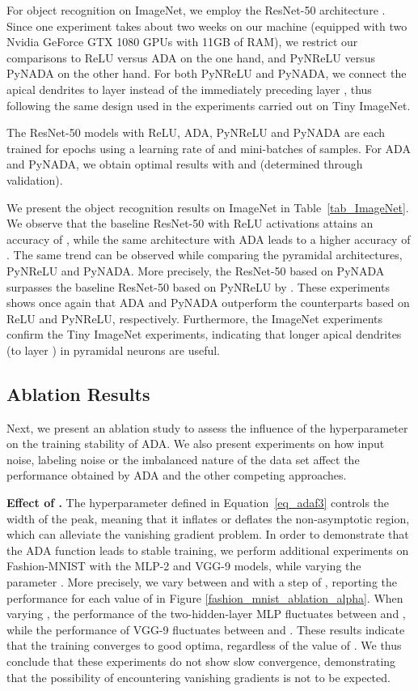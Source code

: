 \documentclass[pdflatex,sn-mathphys]{sn-jnl}
\theoremstyle{thmstyleone}
\theoremstyle{thmstyletwo}\newtheorem{example}{Example}\newtheorem{remark}{Remark}
\theoremstyle{thmstylethree}\newtheorem{definition}{Definition}\DeclareMathOperator{\sinc}{sinc}
\begin{document}
For object recognition on ImageNet, we employ the ResNet-50 architecture \citep{He-CVPR-2016}. Since one experiment takes about two weeks on our machine (equipped with two Nvidia GeForce GTX 1080 GPUs with 11GB of RAM), we restrict our comparisons to ReLU versus ADA on the one hand, and PyNReLU versus PyNADA on the other hand. For both PyNReLU and PyNADA, we connect the apical dendrites to layer  instead of the immediately preceding layer , thus following the same design used in the experiments carried out on Tiny ImageNet.

The ResNet-50 models with ReLU, ADA, PyNReLU and PyNADA are each trained for  epochs using a learning rate of  and mini-batches of  samples. For ADA and PyNADA, we obtain optimal results with  and  (determined through validation).

We present the object recognition results on ImageNet in Table~\ref{tab_ImageNet}. We observe that the baseline ResNet-50 with ReLU activations attains an accuracy of , while the same architecture with ADA leads to a higher accuracy of . The same trend can be observed while comparing the pyramidal architectures, PyNReLU and PyNADA. More precisely, the ResNet-50 based on PyNADA surpasses the baseline ResNet-50 based on PyNReLU by . These experiments shows once again that ADA and PyNADA outperform the counterparts based on ReLU and PyNReLU, respectively. Furthermore, the ImageNet experiments confirm the Tiny ImageNet experiments, indicating that longer apical dendrites (to layer ) in pyramidal neurons are useful.

\subsection{Ablation Results}
\label{sec_results_ablation}

Next, we present an ablation study to assess the influence of the hyperparameter  on the training stability of ADA. We also present experiments on how input noise, labeling noise or the imbalanced nature of the data set affect the performance obtained by ADA and the other competing approaches.

\noindent
{\bf Effect of .} The hyperparameter  defined in Equation~\eqref{eq_adaf3} controls the width of the peak, meaning that it inflates or deflates the non-asymptotic region, which can alleviate the vanishing gradient problem. In order to demonstrate that the ADA function leads to stable training, we perform additional experiments on Fashion-MNIST with the MLP-2 and VGG-9 models, while varying the  parameter . More precisely, we vary  between  and  with a step of , reporting the performance for each value of  in Figure \ref{fashion_mnist_ablation_alpha}. When varying , the performance of the two-hidden-layer MLP fluctuates between  and , while the performance of VGG-9 fluctuates between  and . These results indicate that the training converges to good optima, regardless of the value of . We thus conclude that these experiments do not show slow convergence, demonstrating that the possibility of encountering vanishing gradients is not to be expected.
\end{document}
